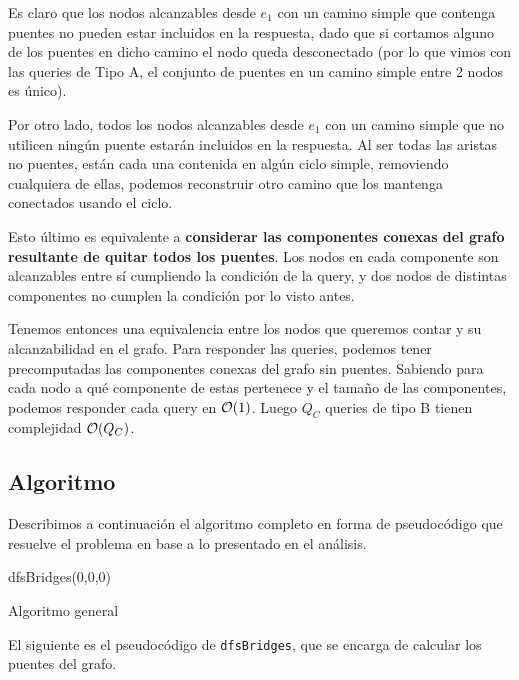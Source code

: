 Es claro que los nodos alcanzables desde $e_1$ con un camino simple que contenga 
puentes no pueden estar incluidos en la respuesta, dado que si cortamos alguno de los puentes en 
dicho camino el nodo queda desconectado (por lo que vimos con las queries de Tipo A, el 
conjunto de puentes en un camino simple entre 2 nodos es único). 

Por otro lado, todos los nodos alcanzables desde $e_1$ con un camino simple que no 
utilicen ningún puente estarán incluidos en la respuesta. 
Al ser todas las aristas no puentes, están cada una contenida en 
algún ciclo simple, removiendo cualquiera de ellas, podemos reconstruir otro camino que 
los mantenga conectados usando el ciclo. 

Esto último es equivalente a \textbf{considerar las componentes conexas del grafo resultante 
de quitar todos los puentes}. Los nodos en cada componente son alcanzables entre sí 
cumpliendo la condición de la query, y dos nodos de distintas componentes no cumplen 
la condición por lo visto antes. 

Tenemos entonces una equivalencia entre los nodos que queremos contar y su alcanzabilidad 
en el grafo. Para responder las queries, podemos tener precomputadas las componentes conexas 
del grafo sin puentes. Sabiendo para cada nodo a qué componente de estas pertenece y el tamaño 
de las componentes, podemos responder cada query en $\mathcal{O}(1)$. Luego $Q_C$ queries 
de tipo B tienen complejidad $\mathcal{O}(Q_C)$. \\

\subsection{Algoritmo}
Describimos a continuación el algoritmo completo en forma de pseudocódigo 
que resuelve el problema en base a lo presentado en el análisis. 

\begin{algorithm}[H]
dfsBridges(0,0,0)\;
\caption{Algoritmo general}
\end{algorithm}

El siguiente es el pseudocódigo de \texttt{dfsBridges}, que se encarga de calcular 
los puentes del grafo. 

